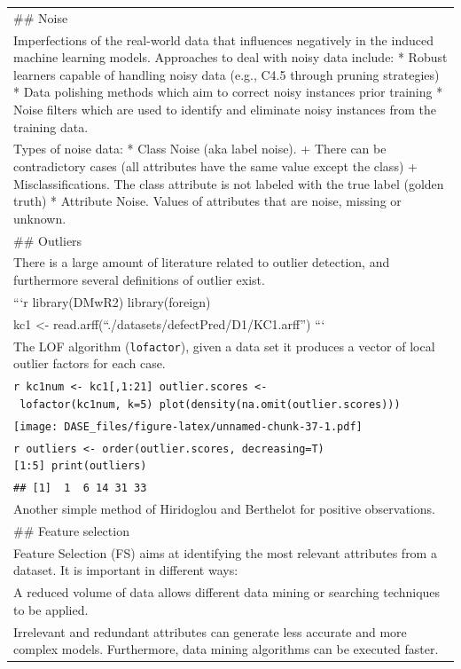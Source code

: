 \documentclass[
]{book}
\begin{document}
\begin{longtable}[]{@{}
  >{\raggedleft\arraybackslash}p{}@{}}
\#\# Noise \\
Imperfections of the real-world data that influences negatively in the induced machine learning models. Approaches to deal with noisy data include:
* Robust learners capable of handling noisy data (e.g., C4.5 through pruning strategies)
* Data polishing methods which aim to correct noisy instances prior training
* Noise filters which are used to identify and eliminate noisy instances from the training data. \\
Types of noise data:
* Class Noise (aka label noise).
+ There can be contradictory cases (all attributes have the same value except the class)
+ Misclassifications. The class attribute is not labeled with the true label (golden truth)
* Attribute Noise. Values of attributes that are noise, missing or unknown. \\
\#\# Outliers \\
There is a large amount of literature related to outlier detection, and furthermore several definitions of outlier exist. \\
```r
library(DMwR2)
library(foreign) \\
kc1 \textless- read.arff(``./datasets/defectPred/D1/KC1.arff'')
``` \\
The LOF algorithm (\texttt{lofactor}), given a data set it produces a vector of local outlier factors for each case. \\
\texttt{r\ kc1num\ \textless{}-\ kc1{[},1:21{]}\ outlier.scores\ \textless{}-\ lofactor(kc1num,\ k=5)\ plot(density(na.omit(outlier.scores)))} \\
\texttt{[image: DASE\_files/figure-latex/unnamed-chunk-37-1.pdf]} \\
\texttt{r\ outliers\ \textless{}-\ order(outlier.scores,\ decreasing=T){[}1:5{]}\ print(outliers)} \\
\texttt{\#\#\ {[}1{]}\ \ 1\ \ 6\ 14\ 31\ 33} \\
Another simple method of Hiridoglou and Berthelot for positive observations. \\
\#\# Feature selection \\
Feature Selection (FS) aims at identifying the most relevant attributes from a dataset. It is important in different ways: \\
* A reduced volume of data allows different data mining or searching techniques to be applied. \\
* Irrelevant and redundant attributes can generate less accurate and more complex models. Furthermore, data mining algorithms can be executed faster. \\

\end{longtable}
\end{document}
